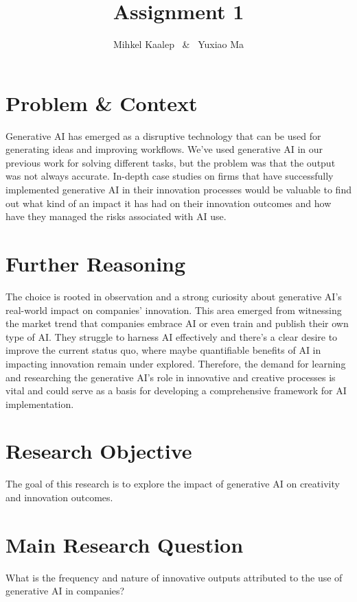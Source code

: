 \documentclass[UTF8,a4paper,AutoFakeBold,AutoFakeSlant]{article}
\title{\textbf{\textsf{{\textsf{Assignment 1}}}}}
\author{\tnewroman Mihkel Kaalep ~\&~ Yuxiao Ma}
\date{}
\begin{document}
\maketitle


\section{Problem \& Context}

Generative AI has emerged as a disruptive technology that can be used for generating ideas and improving workflows. We’ve used generative AI in our previous work for solving different tasks, but the problem was that the output was not always accurate. In-depth case studies on firms that have successfully implemented generative AI in their innovation processes would be valuable to find out what kind of an impact it has had on their innovation outcomes and how have they managed the risks associated with AI use. 

\section{Further Reasoning}

The choice is rooted in observation and a strong curiosity about generative AI’s real-world impact on companies’ innovation. This area emerged from witnessing the market trend that companies embrace AI or even train and publish their own type of AI. They struggle to harness AI effectively and there’s a clear desire to improve the current status quo, where maybe quantifiable benefits of AI in impacting innovation remain under explored. Therefore, the demand for learning and researching the generative AI’s role in innovative and creative processes is vital and could serve as a basis for developing a comprehensive framework for AI implementation.


\section{Research Objective}

The goal of this research is to explore the impact of generative AI on creativity and innovation outcomes.


\section{Main Research Question}

What is the frequency and nature of innovative outputs attributed to the use of generative AI in companies?



% 
% 
% 
\end{document}
